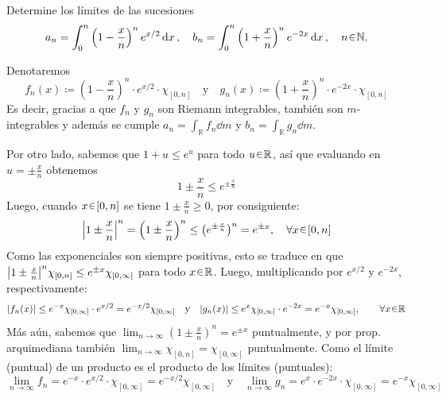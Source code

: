 
\setcounter{neje}{30}
\begin{nejer}
Determine los límites de las sucesiones
$$
a_n = \int_0^n \left( 1 - \frac{x}{n} \right)^n e^{x/2} \dd{x}, \quad b_n = \int_0^n \left( 1 + \frac{x}{n} \right)^n e^{-2x} \dd{x}, \quad n \en \mathbb{N}.
$$
\end{nejer}
\begin{sol}
Denotaremos
\[
f_n(x) \coloneq \left( 1 - \frac{x}{n} \right)^n \cdot e^{x/2}\cdot \chi_{[0,n]}
\quad\text{y}\quad
g_n(x) \coloneq \left( 1 + \frac{x}{n} \right)^n\cdot e^{-2x}\cdot \chi_{[0,n]}
\]
Es decir, gracias a que $f_n$ y $g_n$ son Riemann integrables, también son $m$-integrables y además se cumple $a_n = \int_{\mathbb{R}} f_n \dd{m}$ y $b_n = \int_{\mathbb{R}} g_n \dd{m}$.\par
Por otro lado, sabemos que $1+u \leq e^u$ para todo $u\en\mathbb{R}$, así que evaluando en $u=\pm\frac{x}{n}$ obtenemos
\[
1\pm\frac{x}{n} \leq e^{\pm\frac{x}{n}}
\]
Luego, cuando $x\en[0,n]$ se tiene $1\pm \frac{x}{n} \ge 0$, por consiguiente:
\[
\abs{1\pm\frac{x}{n}}^n = \left(1\pm\frac{x}{n} \right)^n \leq \bigl(e^{\pm\frac{x}{n}}\bigr)^n = e^{\pm x},
\quad\forall x\en[0,n]
\]
Como las exponenciales son siempre positivas, esto se traduce en que $\abs{1\pm\frac{x}{n}}^n\chi_{[0,n]} \leq e^{\pm x}\chi_{[0,\infty]}$ para todo $x\en\mathbb{R}$. Luego, multiplicando por $e^{x/2}$ y $e^{-2x}$, respectivamente:
\[
\abs{f_n(x)} \leq e^{-x}\chi_{[0,\infty]} \cdot e^{x/2} = e ^{-x/2}\chi_{[0,\infty]}
\quad\text{y}\quad
\abs{g_n(x)} \leq e^x\chi_{[0,\infty]}\cdot e^{-2x} = e^{-x}\chi_{[0,\infty]},
\qquad\forall x\en \mathbb{R}
\]
Más aún, sabemos que $\lim_{n\to\infty}(1\pm\frac{x}{n})^n = e^{\pm x}$ puntualmente, y por prop. arquimediana también $\lim_{n\to\infty} \chi_{[0,n]} = \chi_{[0,\infty]}$ puntualmente. Como el límite (puntual) de un producto es el producto de los límites (puntuales):
\[
\lim_{n\to\infty} f_n = e^{-x} \cdot e^{x/2}\cdot\chi_{[0,\infty]} = e ^{-x/2}\chi_{[0,\infty]}
\quad\text{y}\quad
\lim_{n\to\infty} g_n = e^x\cdot e^{-2x}\cdot\chi_{[0,\infty]} = e^{-x}\chi_{[0,\infty]}
\]


\end{sol}
